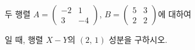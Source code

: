 \hspace*{2mm}\begin{minipage}[t]{\dimexpr\linewidth-2mm\relax}\vspace{0pt}
두 행렬 $A=\begin{pmatrix} -2 & 1 \\ 3 & -4 \end{pmatrix}$, $B=\begin{pmatrix} 5 & 3 \\ 2 & 2 \end{pmatrix}$에 대하여 \par\smallskip{}\par\smallskip\noindent 일 때, 행렬 $X-Y$의 $(2,\,1)$ 성분을 구하시오.\end{minipage}
